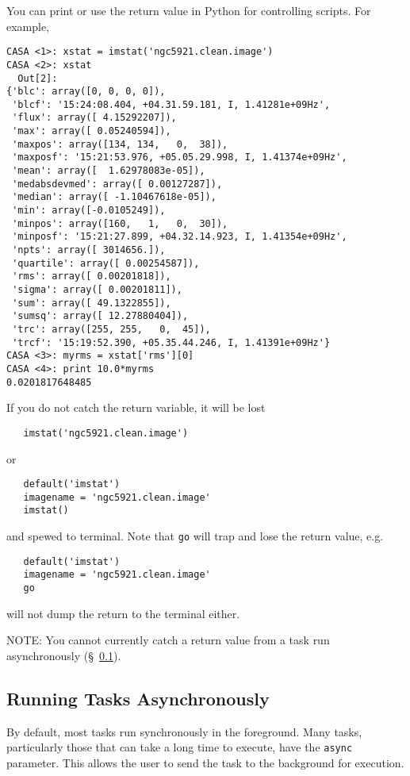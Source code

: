 You can print or use the return value in Python for controlling
scripts.  For example,
\small
\begin{verbatim}
CASA <1>: xstat = imstat('ngc5921.clean.image')
CASA <2>: xstat
  Out[2]: 
{'blc': array([0, 0, 0, 0]),
 'blcf': '15:24:08.404, +04.31.59.181, I, 1.41281e+09Hz',
 'flux': array([ 4.15292207]),
 'max': array([ 0.05240594]),
 'maxpos': array([134, 134,   0,  38]),
 'maxposf': '15:21:53.976, +05.05.29.998, I, 1.41374e+09Hz',
 'mean': array([  1.62978083e-05]),
 'medabsdevmed': array([ 0.00127287]),
 'median': array([ -1.10467618e-05]),
 'min': array([-0.0105249]),
 'minpos': array([160,   1,   0,  30]),
 'minposf': '15:21:27.899, +04.32.14.923, I, 1.41354e+09Hz',
 'npts': array([ 3014656.]),
 'quartile': array([ 0.00254587]),
 'rms': array([ 0.00201818]),
 'sigma': array([ 0.00201811]),
 'sum': array([ 49.1322855]),
 'sumsq': array([ 12.27880404]),
 'trc': array([255, 255,   0,  45]),
 'trcf': '15:19:52.390, +05.35.44.246, I, 1.41391e+09Hz'}
CASA <3>: myrms = xstat['rms'][0]
CASA <4>: print 10.0*myrms
0.0201817648485
\end{verbatim}
\normalsize

If you do not catch the return variable, it will be lost
\small
\begin{verbatim}
   imstat('ngc5921.clean.image')
\end{verbatim}
\normalsize
 or
\small
\begin{verbatim}
   default('imstat')
   imagename = 'ngc5921.clean.image'
   imstat()
\end{verbatim}
\normalsize
and spewed to terminal.  Note that {\tt go} will trap and lose
the return value, e.g.
\small
\begin{verbatim}
   default('imstat')
   imagename = 'ngc5921.clean.image'
   go
\end{verbatim}
\normalsize
will not dump the return to the terminal either.

NOTE: You cannot currently catch a return value from a task run
asynchronously (\S~\ref{section:intro.tasks.async}).

\subsection{Running Tasks Asynchronously}
\label{section:intro.tasks.async}

By default, most tasks run synchronously in the foreground.  Many
tasks, particularly those that can take a long time to execute,
have the {\tt async} parameter.  This allows the user to send the
task to the background for execution.

